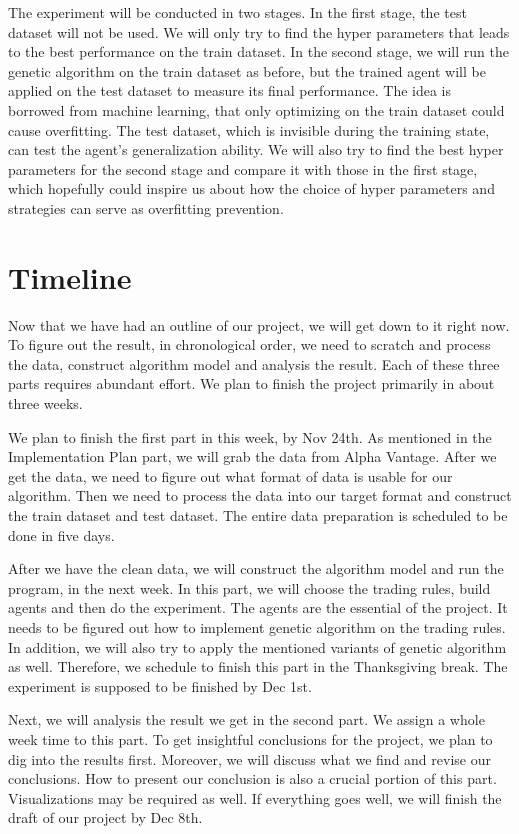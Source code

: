 \documentclass{article}
\begin{document}
The experiment will be conducted in two stages.
In the first stage, the test dataset will not be used.
We will only try to find the hyper parameters that leads to the best performance on the train dataset.
In the second stage, we will run the genetic algorithm on the train dataset as before,
but the trained agent will be applied on the test dataset to measure its final performance.
The idea is borrowed from machine learning, that only optimizing on the train dataset could cause overfitting.
The test dataset, which is invisible during the training state, can test the agent's generalization ability.
We will also try to find the best hyper parameters for the second stage and compare it with those in the first stage,
which hopefully could inspire us about how the choice of hyper parameters and strategies can serve as overfitting prevention.


\section{Timeline}


Now that we have had an outline of our project, we will get down to it right now.
To figure out the result, in chronological order, we need to scratch and process the data, construct algorithm model and analysis the result.
Each of these three parts requires abundant effort.
We plan to finish the project primarily in about three weeks.

We plan to finish the first part in this week, by Nov 24th.
As mentioned in the Implementation Plan part, we will grab the data from Alpha Vantage.
After we get the data, we need to figure out what format of data is usable for our algorithm.
Then we need to process the data into our target format and construct the train dataset and test dataset. 
The entire data preparation is scheduled to be done in five days.

After we have the clean data, we will construct the algorithm model and run the program, in the next week.
In this part, we will choose the trading rules, build agents and then do the experiment.
The agents are the essential of the project.
It needs to be figured out how to implement genetic algorithm on the trading rules.
In addition, we will also try to apply the mentioned variants of genetic algorithm as well.
Therefore, we schedule to finish this part in the Thanksgiving break.
The experiment is supposed to be finished by Dec 1st.

Next, we will analysis the result we get in the second part.
We assign a whole week time to this part.
To get insightful conclusions for the project, we plan to dig into the results first.
Moreover, we will discuss what we find and revise our conclusions.
How to present our conclusion is also a crucial portion of this part.
Visualizations may be required as well.
If everything goes well, we will finish the draft of our project by Dec 8th.
\end{document}

